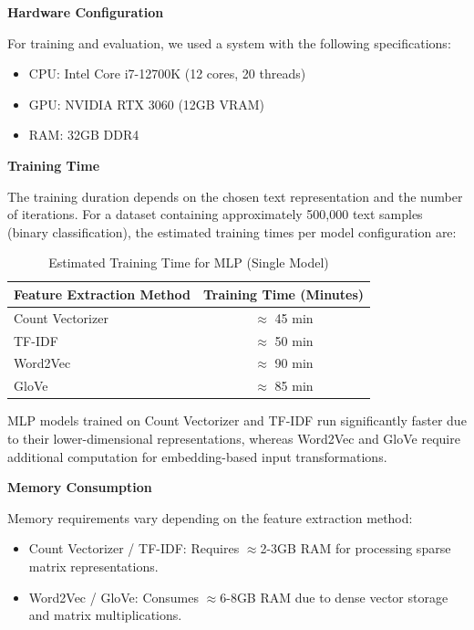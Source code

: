 \textbf{Hardware Configuration}

For training and evaluation, we used a system with the following specifications:

\begin{itemize} \item CPU: Intel Core i7-12700K (12 cores, 20 threads)
\item GPU: NVIDIA RTX 3060 (12GB VRAM)
\item RAM: 32GB DDR4
\end{itemize}

\textbf{Training Time}

The training duration depends on the chosen text representation and the number of iterations. For a dataset containing approximately 500,000 text samples (binary classification), the estimated training times per model configuration are:

\begin{table}[H]
\centering
\caption{Estimated Training Time for MLP (Single Model)}
\label{tab:mlp-training-time}
\begin{tabular}{|l|c|}
\hline
\textbf{Feature Extraction Method} & \textbf{Training Time (Minutes)} \\
\hline
Count Vectorizer & $\approx$ 45 min \\
\hline
TF-IDF & $\approx$ 50 min \\
\hline
Word2Vec & $\approx$ 90 min \\
\hline
GloVe & $\approx$ 85 min \\
\hline
\end{tabular}
\end{table}

MLP models trained on Count Vectorizer and TF-IDF run significantly faster due to their lower-dimensional representations, whereas Word2Vec and GloVe require additional computation for embedding-based input transformations.

\textbf{Memory Consumption}

Memory requirements vary depending on the feature extraction method:

\begin{itemize} \item Count Vectorizer / TF-IDF: Requires $\approx$2-3GB RAM for processing sparse matrix representations.
\item Word2Vec / GloVe: Consumes $\approx$6-8GB RAM due to dense vector storage and matrix multiplications.
\end{itemize}


